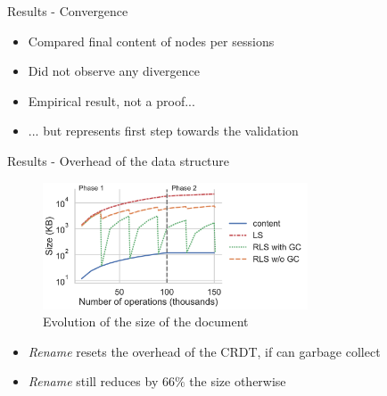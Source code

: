 \documentclass[10pt]{beamer}
\begin{document}
\begin{frame}{Results - Convergence}
  \begin{itemize}
    \item Compared final content of nodes per sessions
    \item Did not observe any divergence
    \pause
    \medskip
    \item Empirical result, not a proof...
    \item ... but represents first step towards the validation
  \end{itemize}
\end{frame}

\begin{frame}{Results - Overhead of the data structure}
  \begin{figure}
    \centering
    \includegraphics[width=0.7\textwidth]{img/snapshots-sizes.pdf}
    \caption{Evolution of the size of the document}
    \label{fig:evolution-document-size}
  \end{figure}

  \vspace{-1\baselineskip}
  \begin{itemize}
    \pause
    \item \emph{Rename} resets the overhead of the CRDT, if can garbage collect
    \pause
    \item \emph{Rename} still reduces by $66\%$ the size otherwise
  \end{itemize}
\end{frame}
\end{document}
